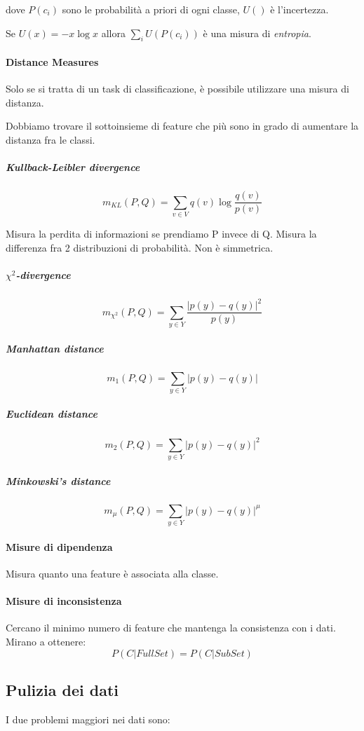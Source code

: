 \documentclass[11pt,onecolumn,a4paper,oneside]{book}
\begin{document}
dove $P(c_i)$ sono le probabilità a priori di ogni classe, $U()$ è l'incertezza.

Se $U(x) = -x \log x$ allora $\sum_i U(P(c_i))$ è una misura di \emph{entropia}. 



\paragraph{Distance Measures}
Solo se si tratta di un task di classificazione, è possibile utilizzare una misura di distanza.

Dobbiamo trovare il sottoinsieme di feature che più sono in grado di aumentare la distanza fra le classi.

\subparagraph{Kullback-Leibler divergence}

$$m_{KL} ( P, Q ) = \sum_{v \in V} q(v) \log \frac{q(v)}{p(v)}$$

Misura la perdita di informazioni se prendiamo P invece di Q.
Misura la differenza fra 2 distribuzioni di probabilità.
Non è simmetrica.

\subparagraph{$\chi ^2$-divergence}

$$m_{\chi^2}( P, Q ) = \sum_{y \in Y} \frac{
\left| p(y)-q(y) \right| ^2}{p(y)} $$

\subparagraph{Manhattan distance}

$$m_1(P,Q) = \sum_{y \in Y} \left| p(y)-q(y) \right|$$

\subparagraph{Euclidean distance}
$$m_2(P,Q) = \sum_{y \in Y} \left| p(y)-q(y) \right|^2$$

\subparagraph{Minkowski's distance}

$$m_\mu(P,Q) = \sum_{y \in Y} \left| p(y)-q(y) \right|^\mu$$

\paragraph{Misure di dipendenza}
Misura quanto una feature è associata alla classe.

\paragraph{Misure di inconsistenza}
Cercano il minimo numero di feature che mantenga la consistenza con i dati.
Mirano a ottenere:
$$P(C|FullSet) = P(C|SubSet)$$


\subsection{Pulizia dei dati}
I due problemi maggiori nei dati sono:
\end{document}
